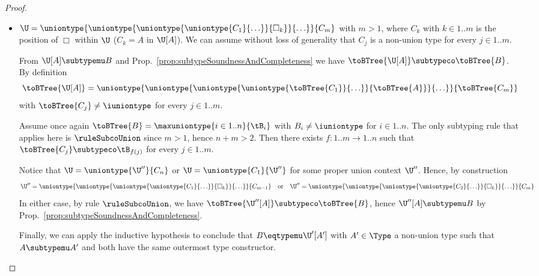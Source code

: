 \begin{proof}
\begin{itemize}
  \item $\U =
  \uniontype{\uniontype{\uniontype{\uniontype{C_1}{\ldots}}{\Box_k}}{\ldots}}{C_m}$
  with $m > 1$, where $C_k$ with $k \in 1..m$ is the position of $\Box$ within $\U$
  (\ie $C_k = A$ in $\U[A]$). We can assume without loss of generality that $C_j$
  is a non-union type for every $j \in 1..m$.
  
  From $\U[A] \subtypemu B$ and
  Prop.~\ref{prop:subtypeSoundnessAndCompleteness} we have $\toBTree{\U[A]}
  \subtypeco \toBTree{B}$. By definition $$\toBTree{\U[A]} =
  \uniontype{\uniontype{\uniontype{\uniontype{\toBTree{C_1}}{\ldots}}{\toBTree{A}}}{\ldots}}{\toBTree{C_m}}$$
  with $\toBTree{C_j} \neq \iuniontype$ for every $j \in 1..m$.
  
  Assume once again $\toBTree{B} = \maxuniontype{i \in 1..n}{\tB_i}$ with $B_i
  \neq \iuniontype$ for $i \in 1..n$. The only subtyping rule that applies
  here is $\ruleSubcoUnion$ since $m > 1$, hence $n + m > 2$. Then there exists
  $f : 1..m \to 1..n$ such that $\toBTree{C_j} \subtypeco \tB_{f(j)}$ for every
  $j \in 1..m$.

  Notice that $\U = \uniontype{\U''}{C_n}$ or $\U = \uniontype{C_1}{\U''}$ for
  some proper union context $\U''$. Hence, by construction $$\U'' =
  \uniontype{\uniontype{\uniontype{\uniontype{C_1}{\ldots}}{\Box_k}}{\ldots}}{C_{m-1}}
  \quad\text{or}\quad \U'' =
  \uniontype{\uniontype{\uniontype{\uniontype{C_2}{\ldots}}{\Box_k}}{\ldots}}{C_m}$$
  In either case, by rule $\ruleSubcoUnion$, we have $\toBTree{\U''[A]}
  \subtypeco \toBTree{B}$, hence $\U''[A] \subtypemu B$ by
  Prop.~\ref{prop:subtypeSoundnessAndCompleteness}.
  
  Finally, we can apply the inductive hypothesis to conclude that $B \eqtypemu
  \U'[A']$ with $A' \in \Type$ a non-union type such that $A \subtypemu A'$ and
  both have the same outermost type constructor. 
\end{itemize}
\end{proof}



